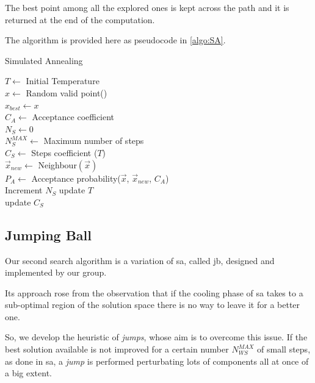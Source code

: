 \documentclass[12pt,journal,draftclsnofoot,onecolumn]{IEEEtran}
\begin{document}
The best point among all the explored ones is kept across the path and it is returned at the end of the computation.

The algorithm is provided here as pseudocode in \autoref{algo:SA}.

\begin{algorithm}
\caption{Simulated Annealing} \label{algo:SA}

$T \gets$ Initial Temperature \\
$x \gets$ Random valid point() \\
$x_{best} \gets x$ \\
$C_A \gets$ Acceptance coefficient \\
$N_S \gets 0$ \\
$N_S^{MAX} \gets $ Maximum number of steps \\

 {
	$C_S \gets$ Steps coefficient ($T$) \\
	 {
		$\vec{x}_{new} \gets$ Neighbour$(\vec{x})$\\
		$P_A \gets$ Acceptance probability($\vec{x}$, $\vec{x}_{new}$, $C_A$) \\
		Increment $N_S$
	}
	update $T$\\
	update $C_S$\\
}
\end{algorithm}

\subsection{Jumping Ball}

Our second search algorithm is a variation of \gls{sa}, called \gls{jb}, designed and implemented by our group.

Its approach rose from the observation that if the cooling phase of \gls{sa} takes to a sub-optimal region of the solution space there is no way to leave it for a better one.

So, we develop the heuristic of \emph{jumps}, whose aim is to overcome this issue. If the best solution available is not improved for a certain number $N_{WS}^{MAX}$ of small steps, as done in \gls{sa}, a \emph{jump} is performed perturbating lots of components all at once of a big extent.
\end{document}

